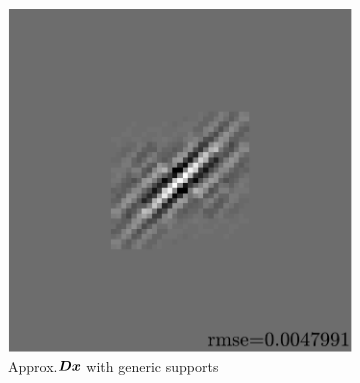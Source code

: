\begin{figure}[!ht]
\begin{subfigure}[b]{0.085\textwidth}
	\caption{}\label{fig_learnsupp_branch-generic_tree}
\end{subfigure}
\begin{subfigure}[b]{0.39\textwidth}\centering
\includegraphics[width=\textwidth]{figures/exple-better-support/xp_128x128_sc2_angl1_K3_S3_node4classic_approx.pdf}
\caption{Approx.\@ $\bm{D}\bm{x}$ with generic supports}\label{fig_xp_fixed_vs_expected_approx1}\label{fig_learnsupp_branch-generic_approx}
\end{subfigure}
\begin{subfigure}[b]{0.085\textwidth}\centering

\end{subfigure}
\end{figure}
